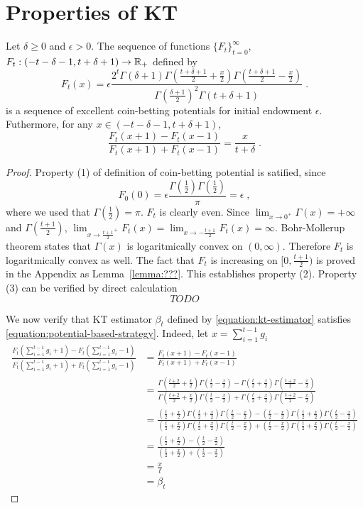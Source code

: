 \section{Properties of KT}

\begin{theorem}[KT potential]
\label{theorem:kt-potential}
Let $\delta \ge 0$ and $\epsilon > 0$. The sequence of functions
$\{F_t\}_{t=0}^\infty$, $F_t:(-t-\delta-1, t+\delta+1) \to \mathbb{R}_+$ defined by
$$
F_t(x) = \epsilon \frac{2^t \Gamma(\delta + 1) \Gamma(\frac{t+\delta+1}{2} + \frac{x}{2}) \Gamma(\frac{t+\delta+1}{2} - \frac{x}{2})}{\Gamma(\frac{\delta+1}{2})^2 \Gamma(t+\delta+1)} \; .
$$
is a sequence of excellent coin-betting potentials for initial endowment $\epsilon$.
Futhermore, for any $x \in (-t-\delta-1, t+\delta+1)$,
$$
\frac{F_t(x+1) - F_{t}(x-1)}{F_t(x+1) + F_{t}(x-1)} = \frac{x}{t+\delta} \; .
$$
\end{theorem}

\begin{proof}
Property (1) of definition of coin-betting potential is satified, since
$$
F_0(0) = \epsilon \frac{\Gamma(\frac{1}{2}) \Gamma(\frac{1}{2})}{\pi} = \epsilon \; ,
$$
where we used that $\Gamma(\frac{1}{2}) = \pi$. $F_t$ is clearly even.
Since $\lim_{x \to 0^+} \Gamma(x) = +\infty$ and $\Gamma(\frac{t+1}{2})$,
$\lim_{x \to \frac{t+1}{2}^+} F_t(x) = \lim_{x \to -\frac{t+1}{2}} F_t(x) = \infty$.
Bohr-Mollerup theorem states that $\Gamma(x)$ is logaritmically convex
on $(0,\infty)$. Therefore $F_t$ is logaritmically convex as well.
The fact that $F_t$ is increasing on $[0,\frac{t+1}{2})$ is proved
in the Appendix as Lemma~\ref{lemma:???}. This establishes property (2).
Property (3) can be verified by direct calculation
$$
TODO
$$

We now verify that KT estimator $\beta_t$ defined by \eqref{equation:kt-estimator}
satisfies \eqref{equation:potential-based-strategy}. Indeed, let $x=\sum_{i=1}^{t-1} g_i$
\begin{align*}
\frac{F_t(\sum_{i=1}^{t-1} g_i + 1) - F_t(\sum_{i=1}^{t-1} g_i - 1)}{F_t(\sum_{i=1}^{t-1} g_i + 1) + F_t(\sum_{i=1}^{t-1} g_i - 1)}
& = \frac{F_t(x + 1) - F_t(x - 1)}{F_t(x + 1) + F_t(x - 1)} \\
& = \frac{\Gamma(\frac{t+2}{2} + \frac{x}{2}) \Gamma(\frac{t}{2} - \frac{x}{2}) - \Gamma(\frac{t}{2} + \frac{x}{2}) \Gamma(\frac{t+2}{2} - \frac{x}{2})}{\Gamma(\frac{t+2}{2} + \frac{x}{2}) \Gamma(\frac{t}{2} - \frac{x}{2}) + \Gamma(\frac{t}{2} + \frac{x}{2}) \Gamma(\frac{t+2}{2} - \frac{x}{2})} \\
& = \frac{(\frac{t}{2} + \frac{x}{2})\Gamma(\frac{t}{2} + \frac{x}{2}) \Gamma(\frac{t}{2} - \frac{x}{2}) - (\frac{t}{2} - \frac{x}{2})\Gamma(\frac{t}{2} + \frac{x}{2}) \Gamma(\frac{t}{2} - \frac{x}{2})}{(\frac{t}{2} + \frac{x}{2})\Gamma(\frac{t}{2} + \frac{x}{2}) \Gamma(\frac{t}{2} - \frac{x}{2}) + (\frac{t}{2} - \frac{x}{2})\Gamma(\frac{t}{2} + \frac{x}{2}) \Gamma(\frac{t}{2} - \frac{x}{2})} \\
& = \frac{(\frac{t}{2} + \frac{x}{2}) - (\frac{t}{2} - \frac{x}{2})}{(\frac{t}{2} + \frac{x}{2}) + (\frac{t}{2} - \frac{x}{2})} \\
& = \frac{x}{t} \\
& = \beta_t
\end{align*}
\end{proof}

